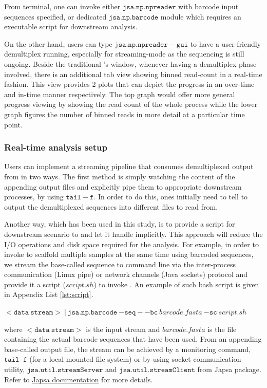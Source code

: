 From terminal, one can invoke either $\mathtt{jsa.np.npreader}$ with barcode input sequences specified, or dedicated $\mathtt{jsa.np.barcode}$ module which requires an executable script for downstream analysis. 

On the other hand, users can type $\mathtt{jsa.np.npreader -gui}$ to have a user-friendly demultiplex running, especially for streaming-mode as the sequencing is still ongoing.
Beside the traditional \npreader{}'s window, whenever having a demultiplex phase involved, there is an additional tab view showing binned read-count in a real-time fashion. This view provides 2 plots that can depict the progress in an over-time and in-time manner respectively. The top graph would offer more general progress viewing by showing the read count of the whole process while the lower graph figures the number of binned reads in more detail at a particular time point.

\subsubsection{Real-time analysis setup}
Users can implement a streaming pipeline that consumes demultiplexed output from \npbarcode{} in two ways. 
The first method is simply watching the content of the appending output files and explicitly pipe them to appropriate downstream processes, \EG{} by using $\mathtt{tail -f}$.
In order to do this, ones initially need to tell \npbarcode{} to output the demultiplexed sequences into different files to read from.

Another way, which has been used in this study, is to provide a script for downstream scenario to \npbarcode{} and let it handle implicitly. This approach will reduce the I/O operations and disk space required for the analysis. For example, in order to invoke \npscarf{} to scaffold multiple samples at the same time using barcoded sequences, we stream the base-called sequence to \npbarcode{} command line via the inter-process communication (Linux pipe) or network channels (Java sockets) protocol \cite{CaoGE2015} and provide it a script ($\mathit{script.sh}$) to invoke \npscarf{}. An example of such bash script is given in Appendix List \ref{lst:script}.

$\mathtt{<data \: stream>}~|~\mathtt{jsa.np.barcode} \ \mathtt{-seq} \ \mathit{-} \ \mathtt{-bc} \ \mathit{barcode.fasta} \ \mathtt{-sc} \ \mathit{script.sh}$

where $\mathtt{<data \: stream>}$ is the input stream and $\mathit{barcode.fasta}$ is the file containing the actual barcode sequences that have been used.
From an appending base-called output file, the stream can be achieved by a monitoring command, \EG{} $\mathtt{tail}\ \text{-}\mathtt{f}$ (for a local mounted file system) or by using socket communication utility, \EG{} $\mathtt{jsa.util.streamServer}$ and $\mathtt{jsa.util.streamClient}$ from Japsa package.
Refer to \href{http://japsa.readthedocs.org/en/latest/index.html}{Japsa documentation} for more details.

